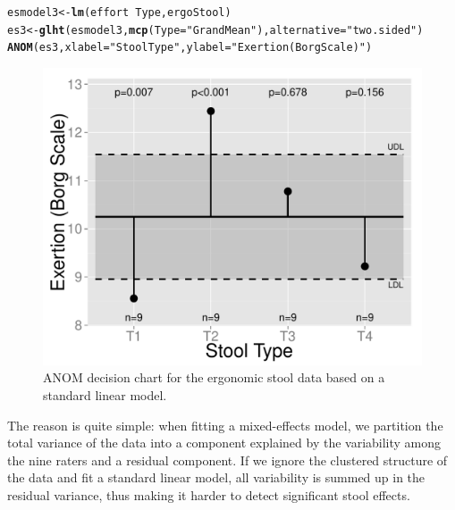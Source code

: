 \documentclass[a4paper]{article}\usepackage[]{graphicx}\usepackage[]{color}
\makeatletter
\def\maxwidth{ %
  \ifdim\Gin@nat@width>\linewidth
    \linewidth
  \else
    \Gin@nat@width
  \fi
}
\newcommand{\hlstr}[1]{\textcolor[rgb]{0.192,0.494,0.8}{#1}}%
\newcommand{\hlopt}[1]{\textcolor[rgb]{0,0,0}{#1}}%
\newcommand{\hlstd}[1]{\textcolor[rgb]{0.345,0.345,0.345}{#1}}%
\newcommand{\hlkwb}[1]{\textcolor[rgb]{0.69,0.353,0.396}{#1}}%
\newcommand{\hlkwc}[1]{\textcolor[rgb]{0.333,0.667,0.333}{#1}}%
\newcommand{\hlkwd}[1]{\textcolor[rgb]{0.737,0.353,0.396}{\textbf{#1}}}%
\newenvironment{kframe}{%
 \def\at@end@of@kframe{}%
 \ifinner\ifhmode%
  \def\at@end@of@kframe{\end{minipage}}%
  \begin{minipage}{\columnwidth}%
 \fi\fi%
 \def\FrameCommand##1{\hskip\@totalleftmargin \hskip-\fboxsep
 \colorbox{shadecolor}{##1}\hskip-\fboxsep
     \hskip-\linewidth \hskip-\@totalleftmargin \hskip\columnwidth}%
 \MakeFramed {\advance\hsize-\width
   \@totalleftmargin\z@ \linewidth\hsize
   \@setminipage}}%
 {\par\unskip\endMakeFramed%
 \at@end@of@kframe}
\newenvironment{knitrout}{}{} %
\makeatother
\begin{document}
\begin{knitrout}
\color{fgcolor}\begin{kframe}
\begin{alltt}
\hlstd{esmodel3} \hlkwb{<-} \hlkwd{lm}\hlstd{(effort} \hlopt{~} \hlstd{Type, ergoStool)}
\hlstd{es3} \hlkwb{<-} \hlkwd{glht}\hlstd{(esmodel3,} \hlkwd{mcp}\hlstd{(}\hlkwc{Type}\hlstd{=}\hlstr{"GrandMean"}\hlstd{),} \hlkwc{alternative}\hlstd{=}\hlstr{"two.sided"}\hlstd{)}
\hlkwd{ANOM}\hlstd{(es3,} \hlkwc{xlabel}\hlstd{=}\hlstr{"Stool Type"}\hlstd{,} \hlkwc{ylabel}\hlstd{=}\hlstr{"Exertion (Borg Scale)"}\hlstd{)}
\end{alltt}
\end{kframe}\begin{figure}
\includegraphics[width=\maxwidth]{figure/MIXIGNORE-1} \caption[ANOM decision chart for the ergonomic stool data based on a standard linear model]{ANOM decision chart for the ergonomic stool data based on a standard linear model.}\label{fig:MIXIGNORE}
\end{figure}


\end{knitrout}

The reason is quite simple: when fitting a mixed-effects model, we partition the total variance of the data into a component explained by the variability among the nine raters and a residual component. If we ignore the clustered structure of the data and fit a standard linear model, all variability is summed up in the residual variance, thus making it harder to detect significant stool effects.

\clearpage




\end{document}
